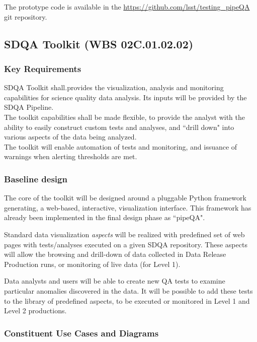 \documentclass[12pt]{article}
\newcommand{\wbsSDQAT}{WBS 02C.01.02.02}
\begin{document}
The prototype code is available in the \url{https://github.com/lsst/testing_pipeQA} git repository.

\clearpage

\subsection{SDQA Toolkit (\wbsSDQAT)}

\subsubsection{Key Requirements}

SDQA Toolkit shall.provides the visualization, analysis and monitoring capabilities for science quality data analysis. Its inputs will be provided by the SDQA Pipeline.
\\

The toolkit capabilities shall be made flexible, to provide the analyst with the ability to easily construct custom tests and analyses, and ``drill down" into various aspects of the data being analyzed.
\\

The toolkit will enable automation of tests and monitoring, and issuance of warnings when alerting thresholds are met.

\subsubsection{Baseline design}

The core of the toolkit will be designed around a pluggable Python framework generating, a web-based, interactive, visualization interface. This framework has already been implemented in the final design phase as ``pipeQA".

Standard data visualization \emph{aspects} will be realized with predefined set of web pages with tests/analyses executed on a given SDQA repository. These aspects will allow the browsing and drill-down of data collected in Data Release Production runs, or monitoring of live data (for Level 1).

Data analysts and users will be able to create new QA tests to examine particular anomalies discovered in the data. It will be possible to add these tests to the library of predefined aspects, to be executed or monitored in Level 1 and Level 2 productions.

\subsubsection{Constituent Use Cases and Diagrams}
\end{document}
